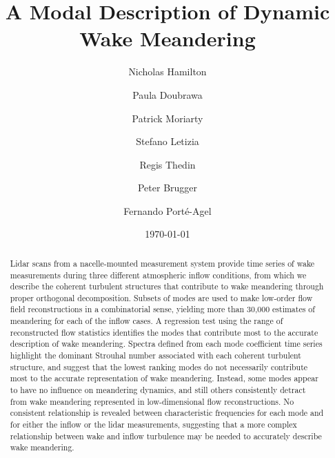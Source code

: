 \documentclass[aip,amsmath,amssymb,preprint]{revtex4-2}
\begin{document}

\title{A Modal Description of Dynamic Wake Meandering}%

\author{Nicholas Hamilton}
\author{Paula Doubrawa}
\author{Patrick Moriarty}
\author{Stefano Letizia}
\author{Regis Thedin}
\author{Peter Brugger}
\author{Fernando Port\'e-Agel}

\date{\today}%

\begin{abstract}
Lidar scans from a nacelle-mounted measurement system provide time series of wake measurements during three different atmospheric inflow conditions, from which we describe the coherent turbulent structures that contribute to wake meandering through proper orthogonal decomposition. 
Subsets of modes are used to make low-order flow field reconstructions in a combinatorial sense, yielding more than 30,000 estimates of meandering for each of the inflow cases.
A regression test using the range of reconstructed flow statistics identifies the modes that contribute most to the accurate description of wake meandering.
Spectra defined from each mode coefficient time series highlight the dominant Strouhal number associated with each coherent turbulent structure, and suggest that the lowest ranking modes do not necessarily contribute most to the accurate representation of wake meandering. 
Instead, some modes appear to have no influence on meandering dynamics, and still others consistently detract from wake meandering represented in low-dimensional flow reconstructions.
No consistent relationship is revealed between characteristic frequencies for each mode and for either the inflow or the lidar measurements, suggesting that a more complex relationship between wake and inflow turbulence may be needed to accurately describe wake meandering.


\end{abstract}
\end{document}
